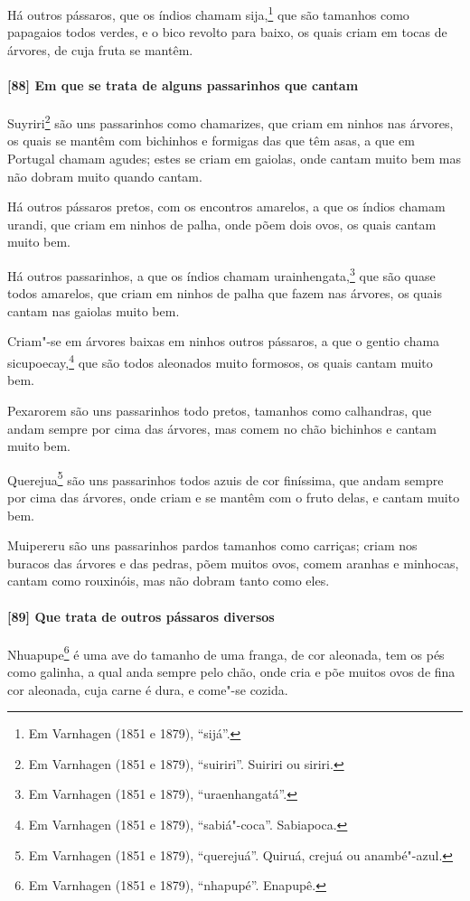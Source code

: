 Há outros pássaros, que os índios chamam sija,\footnote{ Em Varnhagen (1851 e 1879),
``sijá''.} que são tamanhos como papagaios todos verdes, e o bico revolto para baixo, os
quais criam em tocas de árvores, de cuja fruta se mantêm.

\paragraph{[88] Em que se trata de alguns passarinhos que cantam}\quad
Suyriri\footnote{ Em Varnhagen (1851 e 1879), ``suiriri''. Suiriri ou siriri.} são uns
passarinhos como chamarizes, que criam em ninhos nas árvores, os quais se mantêm com
bichinhos e formigas das que têm asas, a que em Portugal chamam agudes; estes se criam em
gaiolas, onde cantam muito bem mas não dobram muito quando cantam.

Há outros pássaros pretos, com os encontros amarelos, a que os índios chamam urandi, que
criam em ninhos de palha, onde põem dois ovos, os quais cantam muito bem.

Há outros passarinhos, a que os índios chamam urainhengata,\footnote{ Em Varnhagen (1851 e
1879), ``uraenhangatá''.} que são quase todos amarelos, que criam em ninhos de palha que
fazem nas árvores, os quais cantam nas gaiolas muito bem.

Criam"-se em árvores baixas em ninhos outros pássaros, a que o gentio chama
sicupoecay,\footnote{ Em Varnhagen (1851 e 1879), ``sabiá"-coca''. Sabiapoca.} que são
todos aleonados muito formosos, os quais cantam muito bem.


Pexarorem são uns passarinhos todo pretos, tamanhos como calhandras, que andam sempre por
cima das árvores, mas comem no chão bichinhos e cantam muito bem.

Querejua\footnote{ Em Varnhagen (1851 e 1879), ``querejuá''. Quiruá, crejuá ou
anambé"-azul.} são uns passarinhos todos azuis de cor finíssima, que andam sempre por cima
das árvores, onde criam e se mantêm com o fruto delas, e cantam muito bem.

Muipereru são uns passarinhos pardos tamanhos como carriças; criam nos buracos das árvores
e das pedras, põem muitos ovos, comem aranhas e minhocas, cantam como rouxinóis, mas não
dobram tanto como eles.

\paragraph{[89] Que trata de outros pássaros diversos}\quad
Nhuapupe\footnote{ Em Varnhagen (1851 e 1879), ``nhapupé''. Enapupê.} é uma ave do tamanho
de uma franga, de cor aleonada, tem os pés como galinha, a qual anda sempre pelo chão,
onde cria e põe muitos ovos de fina cor aleonada, cuja carne é dura, e come"-se cozida.

